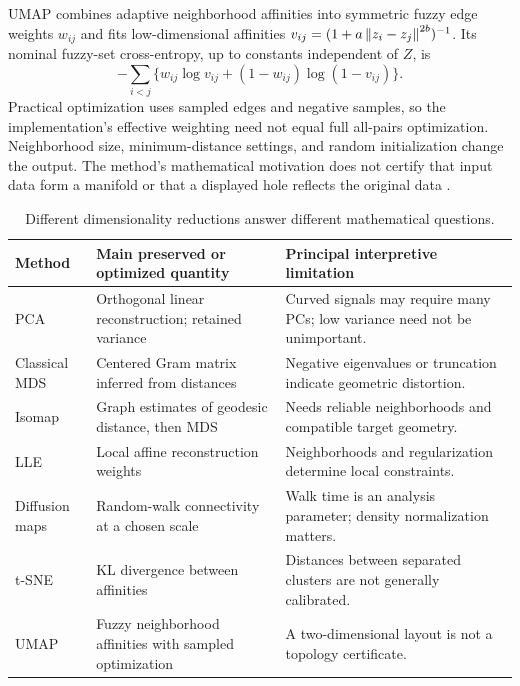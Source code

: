 UMAP combines adaptive neighborhood affinities into symmetric fuzzy edge weights $w_{ij}$ and fits low-dimensional affinities $v_{ij}=(1+a\left\lVert z_i-z_j\right\rVert^{2b})^{-1}$. Its nominal fuzzy-set cross-entropy, up to constants independent of $Z$, is
\begin{equation}
-\sum_{i<j}\{w_{ij}\log v_{ij}+(1-w_{ij})\log(1-v_{ij})\}.
\end{equation}
Practical optimization uses sampled edges and negative samples, so the implementation's effective weighting need not equal full all-pairs optimization. Neighborhood size, minimum-distance settings, and random initialization change the output. The method's mathematical motivation does not certify that input data form a manifold or that a displayed hole reflects the original data \citep{mcinnes2018}.

\begin{table}[htbp]
\centering\small
\begin{tabularx}{\linewidth}{p{.16\linewidth}XX}
\toprule Method & Main preserved or optimized quantity & Principal interpretive limitation\\\midrule
PCA & Orthogonal linear reconstruction; retained variance & Curved signals may require many PCs; low variance need not be unimportant.\\
Classical MDS & Centered Gram matrix inferred from distances & Negative eigenvalues or truncation indicate geometric distortion.\\
Isomap & Graph estimates of geodesic distance, then MDS & Needs reliable neighborhoods and compatible target geometry.\\
LLE & Local affine reconstruction weights & Neighborhoods and regularization determine local constraints.\\
Diffusion maps & Random-walk connectivity at a chosen scale & Walk time is an analysis parameter; density normalization matters.\\
t-SNE & KL divergence between affinities & Distances between separated clusters are not generally calibrated.\\
UMAP & Fuzzy neighborhood affinities with sampled optimization & A two-dimensional layout is not a topology certificate.\\\bottomrule
\end{tabularx}
\caption{Different dimensionality reductions answer different mathematical questions.}
\end{table}

